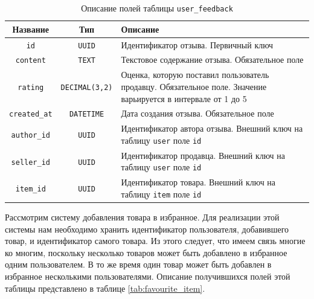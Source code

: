\documentclass[a4paper,14pt]{extarticle}
\begin{document}
\begin{center}
    \begin{longtable}{|c|c|>{\centering\arraybackslash}m{10.5cm}|}
        \caption{Описание полей таблицы \texttt{user\_feedback}}
        \label{tab:user_feedback}
        \\
        \hline
        \textbf{Название}    & \textbf{Тип}          & \textbf{Описание}                                                                                             \\
        \hline
        \texttt{id}          & \texttt{UUID}         & Идентификатор отзыва. Первичный ключ                                                                          \\
        \hline
        \texttt{content}     & \texttt{TEXT}         & Текстовое содержание отзыва. Обязательное поле                                                                \\
        \hline
        \texttt{rating}      & \texttt{DECIMAL(3,2)} & Оценка, которую поставил пользователь продавцу. Обязательное поле. Значение варьируется в интервале от 1 до 5 \\
        \hline
        \texttt{created\_at} & \texttt{DATETIME}     & Дата создания отзыва. Обязательное поле                                                                       \\
        \hline
        \texttt{author\_id}  & \texttt{UUID}         & Идентификатор автора отзыва. Внешний ключ на таблицу \texttt{user} поле \texttt{id}                           \\
        \hline
        \texttt{seller\_id}  & \texttt{UUID}         & Идентификатор продавца. Внешний ключ на таблицу \texttt{user} поле \texttt{id}                                \\
        \hline
        \texttt{item\_id}    & \texttt{UUID}         & Идентификатор товара. Внешний ключ на таблицу \texttt{item} поле \texttt{id}                                  \\
        \hline
    \end{longtable}
\end{center}

Рассмотрим систему добавления товара в избранное. Для реализации этой системы нам необходимо хранить идентификатор пользователя, добавившего товар, и идентификатор самого товара. Из этого следует, что имеем связь многие ко многим, поскольку несколько товаров может быть добавлено в избранное одним пользователем. В то же время один товар может быть добавлен в избранное несколькими пользователями. Описание получившихся полей этой таблицы представлено в таблице \ref{tab:favourite_item}.
\end{document}
